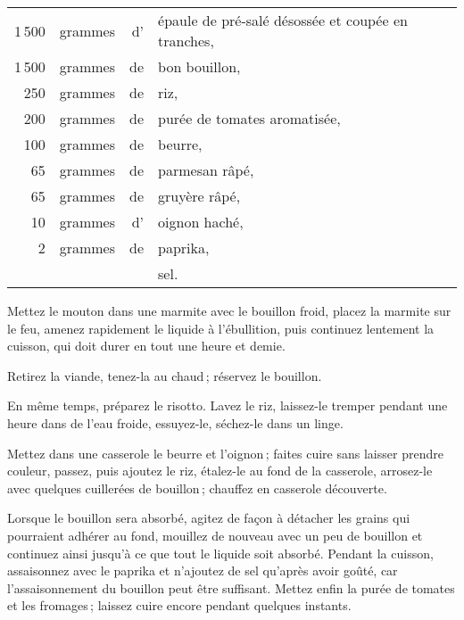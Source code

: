 \footnotesize
\begin{longtable}{rrrp{16em}}
  1 500 & grammes & d' & épaule de pré-salé désossée et coupée en tranches,                               \\
  1 500 & grammes & de & bon bouillon,                                                                    \\
    250 & grammes & de & riz,                                                                             \\
    200 & grammes & de & purée de tomates aromatisée,                                                     \\
    100 & grammes & de & beurre,                                                                          \\
     65 & grammes & de & parmesan râpé,                                                                   \\
     65 & grammes & de & gruyère râpé,                                                                    \\
     10 & grammes & d’ & oignon haché,                                                                    \\
      2 & grammes & de & paprika,                                                                         \\
        &         &    & sel.                                                                             \\
\end{longtable}
\normalsize

Mettez le mouton dans une marmite avec le bouillon froid, placez la marmite sur
le feu, amenez rapidement le liquide à l'ébullition, puis continuez lentement
la cuisson, qui doit durer en tout une heure et demie.

Retirez la viande, tenez-la au chaud ; réservez le bouillon.

En même temps, préparez le risotto. Lavez le riz, laissez-le tremper pendant
une heure dans de l'eau froide, essuyez-le, séchez-le dans un linge.

Mettez dans une casserole le beurre et l'oignon ; faites cuire sans laisser
prendre couleur, passez, puis ajoutez le riz, étalez-le au fond de la
casserole, arrosez-le avec quelques cuillerées de bouillon ; chauffez en
casserole découverte.

Lorsque le bouillon sera absorbé, agitez de façon à détacher les grains qui
pourraient adhérer au fond, mouillez de nouveau avec un peu de bouillon et
continuez ainsi jusqu'à ce que tout le liquide soit absorbé. Pendant la
cuisson, assaisonnez avec le paprika et n'ajoutez de sel qu'après avoir goûté,
car l'assaisonnement du bouillon peut être suffisant. Mettez enfin la purée de
tomates et les fromages ; laissez cuire encore pendant quelques instants.

